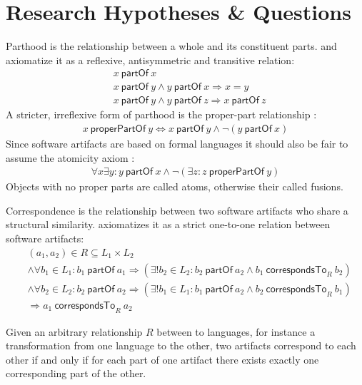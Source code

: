 \documentclass[runningheads,a4paper]{llncs}
\newcommand{\partOf}{~\textsf{partOf}~}
\newcommand{\properPartOf}{~\textsf{properPartOf}~}
\newcommand{\correspondsToR}[1]{~\textsf{correspondsTo}_{#1}~}
\begin{document}
\section{Research Hypotheses \& Questions}
\label{section:ResearchHypthesesAndQuestions}
Parthood is the relationship between a whole and its constituent parts.
\cite{DBLP:journals/dke/Varzi96} and \cite{DBLP:conf/sle/Lammel16} axiomatize it as a reflexive, antisymmetric and transitive relation:
\begin{align*}
&x \partOf x
\\&x \partOf y \wedge y \partOf x \Rightarrow x = y
\\&x \partOf y \wedge y \partOf z \Rightarrow x \partOf z
\end{align*}
A stricter, irreflexive form of parthood is the proper-part relationship \cite{DBLP:journals/dke/Varzi96}:
\begin{align*}
x \properPartOf y
\Leftrightarrow
x \partOf y \wedge \neg(y \partOf x)
\end{align*}
Since software artifacts are based on formal languages it should also be fair to assume the atomicity axiom \cite{DBLP:journals/dke/Varzi96}:
\begin{align*}
\forall x \exists y : 
y \partOf x \wedge \neg(\exists z : z \properPartOf y)
\end{align*}
Objects with no proper parts are called atoms, otherwise their called fusions.

Correspondence is the relationship between two software artifacts who share a structural similarity.
\cite{DBLP:conf/sle/Lammel16} axiomatizes it as a strict one-to-one relation between software artifacts:
\begin{align*}
&(a_1,a_2) \in R \subseteq L_1 \times L_2
\\&\wedge \forall b_1 \in L_1 : b_1 \partOf a_1 \Rightarrow (\exists! b_2 \in L_2 : b_2 \partOf a_2 \wedge b_1 \correspondsToR{R} b_2 )
\\&\wedge \forall b_2 \in L_2 : b_2 \partOf a_2 \Rightarrow (\exists! b_1 \in L_1 : b_1 \partOf a_2 \wedge b_2 \correspondsToR{R} b_1 )
\\&\Rightarrow a_1 \correspondsToR{R} a_2
\end{align*}

Given an arbitrary relationship $R$ between to languages, for instance a transformation from one language to the other, two artifacts correspond to each other if and only if for each part of one artifact there exists exactly one corresponding part of the other.
\end{document}
